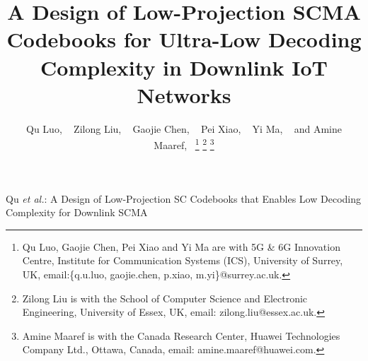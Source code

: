 \documentclass[journal]{IEEEtran}
\begin{document}
%
\title{A Design of Low-Projection SCMA Codebooks  for Ultra-Low Decoding Complexity in Downlink IoT Networks }
%
%
%

\author{Qu Luo,   ~
      Zilong Liu, ~
       Gaojie Chen, ~ 
       Pei Xiao, ~
          Yi Ma, ~
          and  Amine  Maaref,~  
\thanks{ Qu  Luo, Gaojie Chen,  Pei  Xiao  and Yi Ma are  with  5G \& 6G  Innovation Centre, Institute for Communication Systems (ICS), University of Surrey, UK, email:\{q.u.luo,  gaojie.chen, p.xiao, m.yi\}@surrey.ac.uk.}%
\thanks{ Zilong   Liu   is   with   the   School   of   Computer   Science   and   Electronic   Engineering,   University   of   Essex,   UK,    email:   zilong.liu@essex.ac.uk.}%
\thanks{ Amine  Maaref  is   with   the  Canada Research Center, Huawei Technologies Company Ltd., Ottawa, Canada,  email:  amine.maaref@huawei.com.}%
 }
 

 
\markboth{ } 
{Qu \MakeLowercase{\textit{et al.}}: A  Design of Low-Projection  SC Codebooks   that Enables Low Decoding Complexity for Downlink SCMA}%
% 
 



\maketitle
\end{document}
